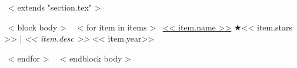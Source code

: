 ~< extends "section.tex" >~

~< block body >~
  ~< for item in items >~
    \href{<< item.repo_url >>}{<< item.name >>} $\bigstar$<< item.stars >> |
    \emph{<< item.desc >>} \hfill
    << item.year>> \par
  ~< endfor >~
~< endblock body >~
